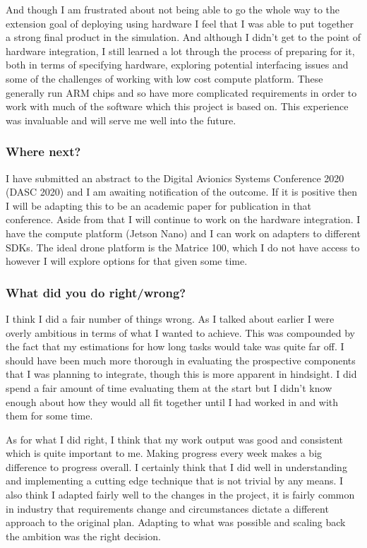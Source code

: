 \documentclass[]{../resources/final_report}
\begin{document}
And though I am frustrated about not being able to go the whole way to the extension goal of 
deploying using hardware I feel that I was able to put together a strong final product in the
simulation. And although I didn't get to the point of hardware integration, I still learned a lot
through the process of preparing for it, both in terms of specifying hardware, exploring potential
interfacing issues and some of the challenges of working with low cost compute platform. These 
generally run ARM chips and so have more complicated requirements in order to work with much 
of the software which this project is based on. This experience was invaluable and will serve me well into 
the future.

\subsubsection{Where next?}
I have submitted an abstract to the Digital Avionics Systems Conference 2020
(DASC 2020) and I am awaiting notification of the outcome. If it is positive then I will be adapting this 
to be an academic paper for publication in that conference. 
Aside from that I will continue to work on the hardware integration. I have the compute platform (Jetson Nano)
and I can work on adapters to different SDKs. The ideal drone platform is the Matrice 100, which I 
do not have access to however I will explore options for that given some time.


\subsubsection{What did you do right/wrong?}

I think I did a fair number of things wrong. As I talked about earlier I were overly ambitious
in terms of what I wanted to achieve. This was compounded by the fact that my estimations for 
how long tasks would take was quite far off. I should have been much more thorough in evaluating 
the prospective components that I was planning to integrate, though this is more apparent in hindsight.
I did spend a fair amount of time evaluating them at the start but I didn't know enough about how they
would all fit together until I had worked in and with them for some time.


As for what I did right, I think that my work output was good and consistent which is quite important 
to me. Making progress every week makes a big difference to progress overall. I certainly think that 
I did well in understanding and implementing a cutting edge technique that is not trivial by any means.
I also think I adapted fairly well to the changes in the project, it is fairly common in industry 
that requirements change and circumstances dictate a different approach to the original plan. Adapting 
to what was possible and scaling back the ambition was the right decision.
\end{document}
